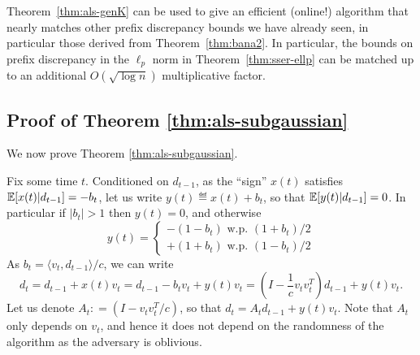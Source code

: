 Theorem~\ref{thm:als-genK} can be used to give an efficient (online!)
algorithm that nearly matches other prefix discrepancy bounds we have
already seen, in particular those derived from Theorem~\ref{thm:bana2}. In particular, the bounds on prefix discrepancy in the
$\ell_p$ norm in Theorem~\ref{thm:sser-ellp} can be matched up to an
additional $O(\sqrt{\log n})$ multiplicative factor. 


\subsection{Proof of Theorem \ref{thm:als-subgaussian}}
We now prove Theorem \ref{thm:als-subgaussian}. 

Fix some time $t$.
Conditioned on $d_{t-1}$, as the ``sign'' $x(t)$ satisfies
$\mathbb{E}[x(t)| d_{t-1}]=-b_t$, let us write $y(t) \eqdef x(t)  + b_t$, 
so that  $\mathbb{E}[y(t)|d_{t-1}]=0$. 
In particular
 if $|b_t|>1$ then $y(t)=0$, and otherwise
\begin{equation}
\label{eq:als-rt}
    y(t)  = \begin{cases} -(1 - b _t) \text{ w.p. }  (1+b_t)/2\\ 
             +(1 +b _t) \text{ w.p. }  (1-b_t)/2
             \end{cases}
\end{equation}
As $b_t = \langle v_t,d_{t-1}\rangle/c$, we can write  
\[ d_t = d_{t-1} + x(t) v_t =   d_{t-1} - b_t v_t + y(t) v_t  =  \left(I - \frac{1}{c}v_tv_t^T\right) d_{t-1} + y(t)v_t.\]
Let us denote $A_t : = (I - v_t v_t^T/c)$, so that $d_t = A_t d_{t-1} + y(t) v_t$.
Note that $A_t$ only depends on $v_t$, and hence it does not depend on the randomness of the algorithm as the adversary is oblivious.

